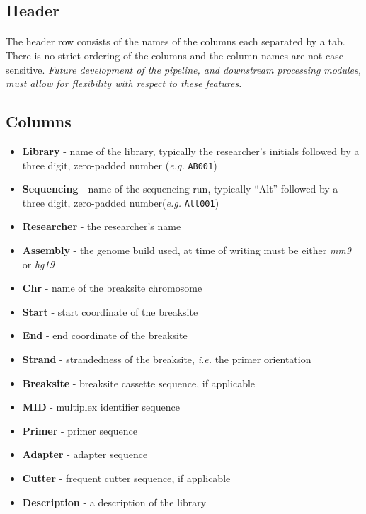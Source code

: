 \documentclass{article}
\begin{document}
\subsection{Header}
\paragraph{} The header row consists of the names of the columns each separated by a tab. There is no strict ordering of the columns and the column names are not case-sensitive. \emph {Future development of the pipeline, and downstream processing modules, must allow for flexibility with respect to these features.}

\subsection{Columns}
\begin{itemize}
  \item \textbf{Library} - name of the library, typically the researcher's initials followed by a three digit, zero-padded number (\emph{e.g.} \texttt{AB001})
  \item \textbf{Sequencing} - name of the sequencing run, typically ``Alt'' followed by a three digit, zero-padded number(\emph{e.g.} \texttt{Alt001})
  \item \textbf{Researcher} - the researcher's name
  \item \textbf{Assembly} - the genome build used, at time of writing must be either \emph{mm9} or \emph{hg19}
  \item \textbf{Chr} - name of the breaksite chromosome
  \item \textbf{Start} - start coordinate of the breaksite
  \item \textbf{End} - end coordinate of the breaksite
  \item \textbf{Strand} - strandedness of the breaksite, \emph{i.e.} the primer orientation
  \item \textbf{Breaksite} - breaksite cassette sequence, if applicable
  \item \textbf{MID} - multiplex identifier sequence
  \item \textbf{Primer} - primer sequence
  \item \textbf{Adapter} - adapter sequence
  \item \textbf{Cutter} - frequent cutter sequence, if applicable
  \item \textbf{Description} - a description of the library
\end{itemize}
\end{document}
